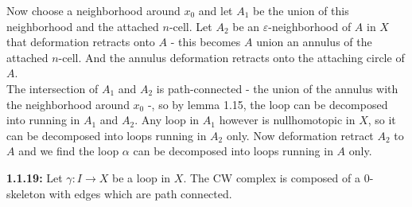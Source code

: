 \documentclass[a4paper]{article}
\begin{document}
Now choose a neighborhood around $x_0$ and let
$A_1$ be the union of this neighborhood and the attached
$n$-cell. Let $A_2$ be an $\varepsilon$-neighborhood of
$A$ in $X$ that deformation retracts onto $A$ - this
becomes $A$ union an annulus of the attached $n$-cell. 
And the annulus deformation retracts onto the attaching
circle of $A$.\\


The intersection of $A_1$ and $A_2$ is path-connected
 - the union of the annulus with the neighborhood around $x_0$ -, so
by lemma 1.15, the loop can be decomposed into running
in $A_1$ and $A_2$. Any loop in $A_1$ however is 
nullhomotopic in $X$, so it can be decomposed into loops
running in $A_2$ only. Now deformation retract $A_2$ to
$A$ and we find the loop  $\alpha$ can be decomposed
into loops running in $A$ only.\\
\linebreak









\textbf{1.1.19:} Let $\gamma  \colon I \to X$ be a 
loop in $X$. The CW complex is composed of
a 0-skeleton with edges which are path connected.
\end{document}
